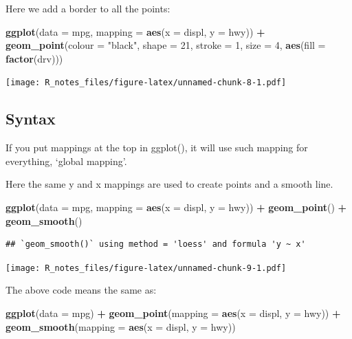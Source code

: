 \documentclass[]{book}
\newenvironment{Shaded}{\begin{snugshade}}{\end{snugshade}}
\newcommand{\KeywordTok}[1]{\textcolor[rgb]{0.13,0.29,0.53}{\textbf{#1}}}
\newcommand{\DataTypeTok}[1]{\textcolor[rgb]{0.13,0.29,0.53}{#1}}
\newcommand{\DecValTok}[1]{\textcolor[rgb]{0.00,0.00,0.81}{#1}}
\newcommand{\StringTok}[1]{\textcolor[rgb]{0.31,0.60,0.02}{#1}}
\newcommand{\OperatorTok}[1]{\textcolor[rgb]{0.81,0.36,0.00}{\textbf{#1}}}
\newcommand{\NormalTok}[1]{#1}
\begin{document}
Here we add a border to all the points:

\begin{Shaded}
\begin{Highlighting}[]
\KeywordTok{ggplot}\NormalTok{(}\DataTypeTok{data =}\NormalTok{ mpg, }\DataTypeTok{mapping =} \KeywordTok{aes}\NormalTok{(}\DataTypeTok{x =}\NormalTok{ displ, }\DataTypeTok{y =}\NormalTok{ hwy)) }\OperatorTok{+}
\StringTok{  }\KeywordTok{geom_point}\NormalTok{(}\DataTypeTok{colour =} \StringTok{"black"}\NormalTok{, }\DataTypeTok{shape =} \DecValTok{21}\NormalTok{, }\DataTypeTok{stroke =} \DecValTok{1}\NormalTok{, }\DataTypeTok{size =} \DecValTok{4}\NormalTok{, }
             \KeywordTok{aes}\NormalTok{(}\DataTypeTok{fill =} \KeywordTok{factor}\NormalTok{(drv)))}
\end{Highlighting}
\end{Shaded}

\texttt{[image: R\_notes\_files/figure-latex/unnamed-chunk-8-1.pdf]}

\subsection{Syntax}\label{syntax}

If you put mappings at the top in ggplot(), it will use such mapping for
everything, `global mapping'.

Here the same y and x mappings are used to create points and a smooth
line.

\begin{Shaded}
\begin{Highlighting}[]
\KeywordTok{ggplot}\NormalTok{(}\DataTypeTok{data =}\NormalTok{ mpg, }\DataTypeTok{mapping =} \KeywordTok{aes}\NormalTok{(}\DataTypeTok{x =}\NormalTok{ displ, }\DataTypeTok{y =}\NormalTok{ hwy)) }\OperatorTok{+}\StringTok{ }
\StringTok{  }\KeywordTok{geom_point}\NormalTok{() }\OperatorTok{+}\StringTok{ }
\StringTok{  }\KeywordTok{geom_smooth}\NormalTok{()}
\end{Highlighting}
\end{Shaded}

\begin{verbatim}
## `geom_smooth()` using method = 'loess' and formula 'y ~ x'
\end{verbatim}

\texttt{[image: R\_notes\_files/figure-latex/unnamed-chunk-9-1.pdf]}

The above code means the same as:

\begin{Shaded}
\begin{Highlighting}[]
\KeywordTok{ggplot}\NormalTok{(}\DataTypeTok{data =}\NormalTok{ mpg) }\OperatorTok{+}\StringTok{ }
\StringTok{  }\KeywordTok{geom_point}\NormalTok{(}\DataTypeTok{mapping =} \KeywordTok{aes}\NormalTok{(}\DataTypeTok{x =}\NormalTok{ displ, }\DataTypeTok{y =}\NormalTok{ hwy)) }\OperatorTok{+}
\StringTok{  }\KeywordTok{geom_smooth}\NormalTok{(}\DataTypeTok{mapping =} \KeywordTok{aes}\NormalTok{(}\DataTypeTok{x =}\NormalTok{ displ, }\DataTypeTok{y =}\NormalTok{ hwy))}
\end{Highlighting}
\end{Shaded}
\end{document}
